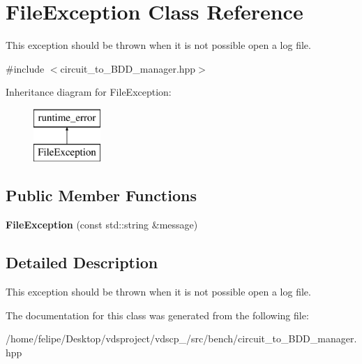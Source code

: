 \section{File\+Exception Class Reference}
\label{classFileException}


This exception should be thrown when it is not possible open a log file.  




{\ttfamily \#include $<$circuit\+\_\+to\+\_\+\+B\+D\+D\+\_\+manager.\+hpp$>$}

Inheritance diagram for File\+Exception\+:\begin{figure}[H]
\begin{center}
\leavevmode
\includegraphics[height=2.000000cm]{classFileException}
\end{center}
\end{figure}
\subsection*{Public Member Functions}
\begin{DoxyCompactItemize}
\item 
{\bfseries File\+Exception} (const std\+::string \&message)\label{classFileException_a0d1f9f85f7fd4b70c619f80602ad1146}

\end{DoxyCompactItemize}


\subsection{Detailed Description}
This exception should be thrown when it is not possible open a log file. 

The documentation for this class was generated from the following file\+:\begin{DoxyCompactItemize}
\item 
/home/felipe/\+Desktop/vdsproject/vdscp\+\_/src/bench/circuit\+\_\+to\+\_\+\+B\+D\+D\+\_\+manager.\+hpp\end{DoxyCompactItemize}
